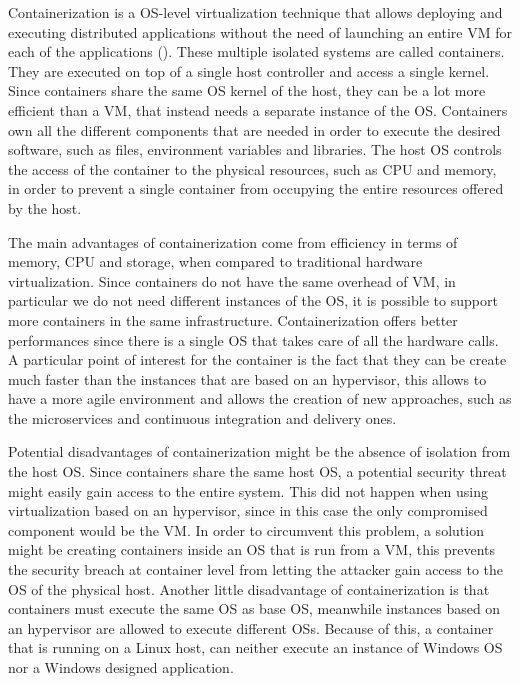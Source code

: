 Containerization is a OS-level virtualization technique that allows deploying and executing distributed applications without the need of launching an entire VM for each of the applications (). These multiple isolated systems are called containers. They are executed on top of a single host controller and access a single kernel.
Since containers share the same OS kernel of the host, they can be a lot more efficient than a VM, that instead needs a separate instance of the OS. Containers own all the different components that are needed in order to execute the desired software, such as files, environment variables and libraries. The host OS controls the access of the container to the physical resources, such as CPU and memory, in order to prevent a single container from occupying the entire resources offered by the host.

The main advantages of containerization come from efficiency in terms of memory, CPU and storage, when compared to traditional hardware virtualization. Since containers do not have the same overhead of VM, in particular we do not need different instances of the OS, it is possible to support more containers in the same infrastructure. Containerization offers better performances since there is a single OS that takes care of all the hardware calls. A particular point of interest for the container is the fact that they can be create much faster than
the instances that are based on an hypervisor, this allows to have a more agile environment and allows the creation of new approaches, such as the microservices and continuous integration and delivery ones. 

Potential disadvantages of containerization might be the absence of isolation from the host OS. Since containers share the same host OS, a potential security threat might easily gain access to the entire system. This did not happen when using virtualization based on an hypervisor,
since in this case the only compromised component would be the VM. In order to circumvent this problem, a solution might be creating containers inside an OS that is run from a VM, this prevents the security breach at container level from letting the attacker gain access to the OS of the physical host. Another little disadvantage of containerization is that containers must execute the same OS as base OS, meanwhile instances based on an hypervisor are allowed to execute different OSs. Because of this, a container that is running on a Linux host, can neither execute an instance of Windows OS nor a Windows designed application.

